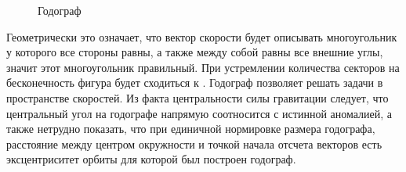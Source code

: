 \begin{wrapfigure}[15]{l}{0.5\tw}
    \centering
    \vspace{-1pc}
        \caption{Годограф}
    	\label{pic:hodograph2}    
\end{wrapfigure}
\noindent Геометрически это означает, что вектор скорости будет описывать многоугольник у которого все стороны равны, а также между собой равны все внешние углы, значит этот многоугольник правильный. При устремлении количества секторов на бесконечность фигура будет сходиться к . Годограф позволяет решать задачи в пространстве скоростей. Из факта центральности силы гравитации следует, что центральный угол на годографе напрямую соотносится с истинной аномалией, а также нетрудно показать, что при единичной нормировке размера годографа, расстояние между центром окружности и точкой начала отсчета векторов есть эксцентриситет орбиты для которой был построен годограф.

